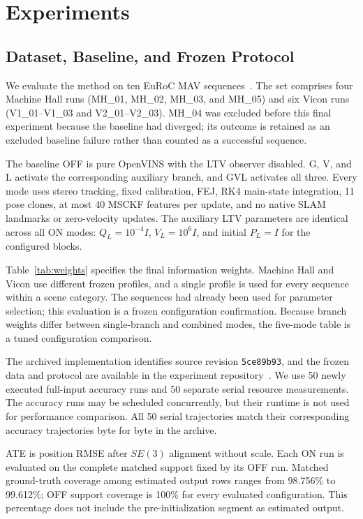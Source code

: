 \documentclass[a4paper,runningheads,twocolumn]{llncs}
\begin{document}
\section{Experiments}
\subsection{Dataset, Baseline, and Frozen Protocol}
We evaluate the method on ten EuRoC MAV sequences~\cite{burri2016}. The set comprises four Machine Hall runs (MH\_01, MH\_02, MH\_03, and MH\_05) and six Vicon runs (V1\_01--V1\_03 and V2\_01--V2\_03). MH\_04 was excluded before this final experiment because the baseline had diverged; its outcome is retained as an excluded baseline failure rather than counted as a successful sequence.

The baseline OFF is pure OpenVINS with the LTV observer disabled. G, V, and L activate the corresponding auxiliary branch, and GVL activates all three. Every mode uses stereo tracking, fixed calibration, FEJ, RK4 main-state integration, 11 pose clones, at most 40 MSCKF features per update, and no native SLAM landmarks or zero-velocity updates. The auxiliary LTV parameters are identical across all ON modes: $Q_L=10^{-4}I$, $V_L=10^6I$, and initial $P_L=I$ for the configured blocks.

Table~\ref{tab:weights} specifies the final information weights. Machine Hall and Vicon use different frozen profiles, and a single profile is used for every sequence within a scene category. The sequences had already been used for parameter selection; this evaluation is a frozen configuration confirmation. Because branch weights differ between single-branch and combined modes, the five-mode table is a tuned configuration comparison.


The archived implementation identifies source revision \texttt{5ce89b93}, and the frozen data and protocol are available in the experiment repository~\cite{experiment2026}. We use 50 newly executed full-input accuracy runs and 50 separate serial resource measurements. The accuracy runs may be scheduled concurrently, but their runtime is not used for performance comparison. All 50 serial trajectories match their corresponding accuracy trajectories byte for byte in the archive.

ATE is position RMSE after $SE(3)$ alignment without scale. Each ON run is evaluated on the complete matched support fixed by its OFF run. Matched ground-truth coverage among estimated output rows ranges from 98.756\% to 99.612\%; OFF support coverage is 100\% for every evaluated configuration. This percentage does not include the pre-initialization segment as estimated output.
\end{document}

